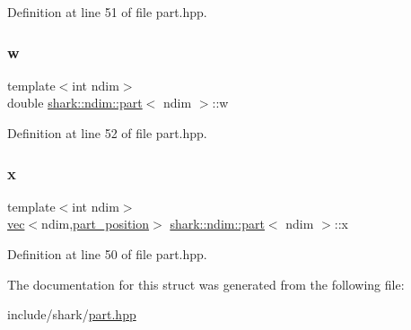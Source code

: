 Definition at line 51 of file part.\+hpp.

\hypertarget{structshark_1_1ndim_1_1part_a030c3103f8272c8119666a818b99c513}{}\label{structshark_1_1ndim_1_1part_a030c3103f8272c8119666a818b99c513} 
\subsubsection{\texorpdfstring{w}{w}}
{\footnotesize\ttfamily template$<$int ndim$>$ \\
double \hyperlink{structshark_1_1ndim_1_1part}{shark\+::ndim\+::part}$<$ ndim $>$\+::w}



Definition at line 52 of file part.\+hpp.

\hypertarget{structshark_1_1ndim_1_1part_a8683feb6fd18c499f11f72dcdd3b7c1a}{}\label{structshark_1_1ndim_1_1part_a8683feb6fd18c499f11f72dcdd3b7c1a} 
\subsubsection{\texorpdfstring{x}{x}}
{\footnotesize\ttfamily template$<$int ndim$>$ \\
\hyperlink{structshark_1_1ndim_1_1vec}{vec}$<$ndim,\hyperlink{structshark_1_1ndim_1_1part__position}{part\+\_\+position}$>$ \hyperlink{structshark_1_1ndim_1_1part}{shark\+::ndim\+::part}$<$ ndim $>$\+::x}



Definition at line 50 of file part.\+hpp.



The documentation for this struct was generated from the following file\+:\begin{DoxyCompactItemize}
\item 
include/shark/\hyperlink{part_8hpp}{part.\+hpp}\end{DoxyCompactItemize}
